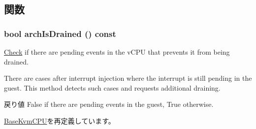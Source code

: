 \subsection{関数}
\hypertarget{classX86KvmCPU_a1d97c7e0665d576bb463335078bb02ec}{
\subsubsection[{archIsDrained}]{\setlength{\rightskip}{0pt plus 5cm}bool archIsDrained () const}}
\label{classX86KvmCPU_a1d97c7e0665d576bb463335078bb02ec}
\hyperlink{classCheck}{Check} if there are pending events in the vCPU that prevents it from being drained.

There are cases after interrupt injection where the interrupt is still pending in the guest. This method detects such cases and requests additional draining.

\begin{DoxyReturn}{戻り値}
False if there are pending events in the guest, True otherwise. 
\end{DoxyReturn}


\hyperlink{classBaseKvmCPU_a4ee4cbdc5d3315fd8016b44d3e77abd5}{BaseKvmCPU}を再定義しています。


